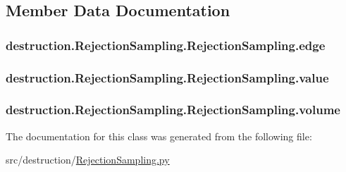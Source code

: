 \subsection{Member Data Documentation}
\hypertarget{classdestruction_1_1_rejection_sampling_1_1_rejection_sampling_a9ad2a1e7f3000562a06c41cdc18d0df6}{
\subsubsection[{edge}]{\setlength{\rightskip}{0pt plus 5cm}destruction.\-Rejection\-Sampling.\-Rejection\-Sampling.\-edge}}\label{classdestruction_1_1_rejection_sampling_1_1_rejection_sampling_a9ad2a1e7f3000562a06c41cdc18d0df6}
\hypertarget{classdestruction_1_1_rejection_sampling_1_1_rejection_sampling_aac80b0c198da797d0a07b0e6413920e3}{
\subsubsection[{value}]{\setlength{\rightskip}{0pt plus 5cm}destruction.\-Rejection\-Sampling.\-Rejection\-Sampling.\-value}}\label{classdestruction_1_1_rejection_sampling_1_1_rejection_sampling_aac80b0c198da797d0a07b0e6413920e3}
\hypertarget{classdestruction_1_1_rejection_sampling_1_1_rejection_sampling_a54f5fd7f337780a7763ef73d757bc001}{
\subsubsection[{volume}]{\setlength{\rightskip}{0pt plus 5cm}destruction.\-Rejection\-Sampling.\-Rejection\-Sampling.\-volume}}\label{classdestruction_1_1_rejection_sampling_1_1_rejection_sampling_a54f5fd7f337780a7763ef73d757bc001}


The documentation for this class was generated from the following file\-:\begin{DoxyCompactItemize}
\item 
src/destruction/\hyperlink{_rejection_sampling_8py}{Rejection\-Sampling.\-py}\end{DoxyCompactItemize}
